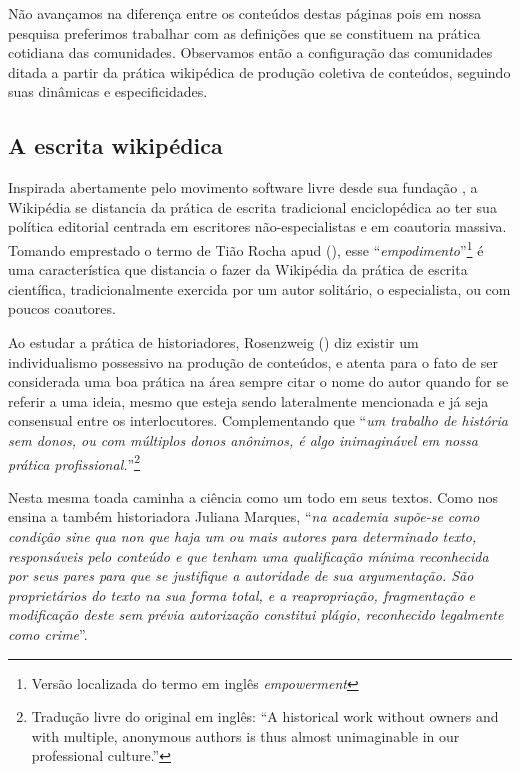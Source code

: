 Não avançamos na diferença entre os conteúdos destas páginas pois em nossa pesquisa preferimos trabalhar com as definições que se constituem na prática cotidiana das comunidades. Observamos então a configuração das comunidades ditada a partir da prática wikipédica de produção coletiva de conteúdos, seguindo suas dinâmicas e especificidades.

\subsection{A escrita wikipédica}

Inspirada abertamente pelo movimento software livre desde sua fundação \citep{lih_wikirevolution_2009}, a Wikipédia se distancia da prática de escrita tradicional enciclopédica ao ter sua política editorial centrada em escritores não-especialistas e em coautoria massiva. Tomando emprestado o termo de Tião Rocha apud (\cite{severo_tics_2016}), esse ``\textit{empodimento}''\footnote{Versão localizada do termo em inglês \textit{empowerment}} é uma característica que distancia o fazer da Wikipédia da prática de escrita científica, tradicionalmente exercida por um autor solitário, o especialista, ou com poucos coautores.

Ao estudar a prática de historiadores, Rosenzweig (\citeyear{rosenzweig_can_2006}) diz existir um individualismo possessivo na produção de conteúdos, e atenta para o fato de ser considerada uma boa prática na área sempre citar o nome do autor quando for se referir a uma ideia, mesmo que esteja sendo lateralmente mencionada e já seja consensual entre os interlocutores. Complementando que ``\textit{um trabalho de história sem donos, ou com múltiplos donos anônimos, é algo inimaginável em nossa prática profissional.}''\footnote{Tradução livre do original em inglês: ``A historical work without owners and with multiple, anonymous authors is thus almost unimaginable in our professional culture.''} 

Nesta mesma toada caminha a ciência como um todo em seus textos. Como nos ensina a também historiadora Juliana Marques, ``\textit{na academia supõe-se como condição sine qua non que haja um ou mais autores para determinado texto, responsáveis pelo conteúdo e que tenham uma qualificação mínima reconhecida por seus pares para que se justifique a autoridade de sua argumentação. São proprietários do texto na sua forma total, e a reapropriação, fragmentação e modificação deste sem prévia autorização constitui plágio, reconhecido legalmente como crime}''. \citep[337]{marques_trabalhando_2012}

